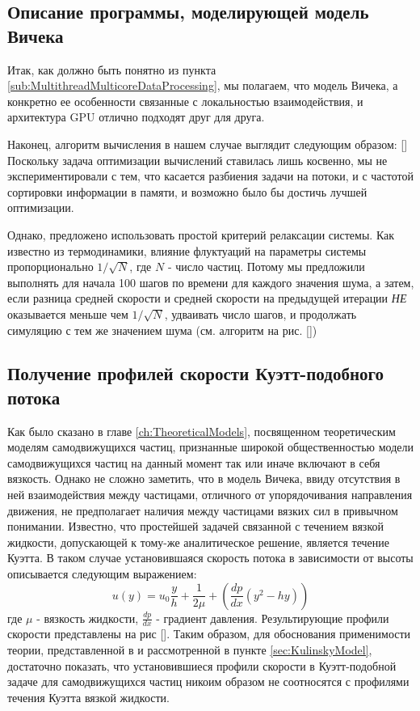 \subsection{Описание программы, моделирующей модель Вичека} %
\label{sub:ViksecModelProgramm}
    Итак, как должно быть понятно из пункта \ref{sub:MultithreadMulticoreDataProcessing}, мы полагаем, что модель Вичека, а конкретно ее особенности связанные с локальностью взаимодействия, и архитектура GPU отлично подходят друг для друга.

    Наконец, алгоритм вычисления в нашем случае выглядит следующим образом: []
    Поскольку задача оптимизации вычислений ставилась лишь косвенно, мы не экспериментировали с тем, что касается разбиения задачи на потоки, и с частотой сортировки информации в памяти, и возможно было бы достичь лучшей оптимизации.
    
    Однако, предложено использовать простой критерий релаксации системы. Как известно из термодинамики, влияние флуктуаций на параметры системы пропорционально $1/\sqrt{N}$, где $N$ - число частиц. Потому мы предложили выполнять для начала 100 шагов по времени для каждого значения шума, а затем, если разница средней скорости и средней скорости на предыдущей итерации \textit{НЕ} оказывается меньше чем $1/\sqrt{N}$, удваивать число шагов, и продолжать симуляцию с тем же значением шума (см. алгоритм на рис. [])

\subsection{Получение профилей скорости Куэтт-подобного потока} %
\label{sub:SpeedProfilesOfCouetteFlow}
    Как было сказано в главе \ref{ch:TheoreticalModels}, посвященном теоретическим моделям самодвижущихся частиц, признанные широкой общественностью модели самодвижущихся частиц на данный момент так или иначе включают в себя вязкость. Однако не сложно заметить, что в модель Вичека, ввиду отсутствия в ней взаимодействия между частицами, отличного от упорядочивания направления движения, не предполагает наличия между частицами вязких сил в привычном понимании. Известно, что простейшей задачей связанной с течением вязкой жидкости, допускающей к тому-же аналитическое решение, является течение Куэтта. В таком случае установившаяся скорость потока в зависимости от высоты описывается следующим выражением:
    \begin{equation} \label{eq:CoetteFlow}
        u(y) = u_0 \frac{y}{h} + \frac{1}{2\mu} + (\frac{dp}{dx}(y^2 -hy))
    \end{equation}
    где $\mu$ - вязкость жидкости, $\frac{dp}{dx}$ - градиент давления. Результирующие профили скорости представлены на рис [].
    Таким образом, для обоснования применимости теории, представленной в \cite{chepizhko2013} и рассмотренной в пункте \ref{sec:KulinskyModel}, достаточно показать, что установившиеся профили скорости в Куэтт-подобной задаче для самодвижущихся частиц никоим образом не соотносятся с профилями течения Куэтта вязкой жидкости.

